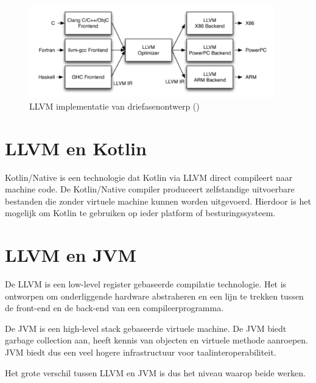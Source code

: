 \begin{figure} [ht]
	\centering
	\includegraphics[width=0.95\textwidth]{img/llvmirdriefasen}
	\caption{LLVM implementatie van driefasenontwerp (\cite{aosa})}
	\label{fig:llvmirdriefasen}
\end{figure}

\section{LLVM en Kotlin}
Kotlin/Native is een technologie dat Kotlin via LLVM direct compileert naar machine code. De Kotlin/Native compiler produceert zelfstandige uitvoerbare bestanden die zonder virtuele machine kunnen worden uitgevoerd. Hierdoor is het mogelijk om Kotlin te gebruiken op ieder platform of besturingssysteem.

\section{LLVM en JVM}
De LLVM is een low-level register gebaseerde compilatie technologie. Het is ontworpen om onderliggende hardware abstraheren en een lijn te trekken tussen de front-end en de back-end van een compileerprogramma.

De JVM is een high-level stack gebaseerde virtuele machine. De JVM biedt garbage collection aan, heeft kennis van objecten en virtuele methode aanroepen. JVM biedt dus een veel hogere infrastructuur voor taalinteroperabiliteit.

Het grote verschil tussen LLVM en JVM is dus het niveau waarop beide werken.
